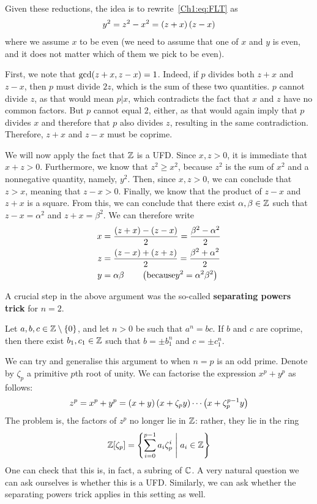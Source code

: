 Given these reductions, the idea is to rewrite~\eqref{Ch1:eq:FLT} as
\begin{align*}
    y^2 = z^2 - x^2 = \left( z + x \right)\left( z - x \right)
\end{align*}
where we assume $x$ to be even (we need to assume that one of $x$ and $y$ is even, and it does not matter which of them we pick to be even).

First, we note that $\gcd\!\left( z + x, z - x \right) = 1$. Indeed, if $p$ divides both $z + x$ and $z - x$, then $p$ must divide $2z$, which is the sum of these two quantities. $p$ cannot divide $z$, as that would mean $p \vert x$, which contradicts the fact that $x$ and $z$ have no common factors. But $p$ cannot equal $2$, either, as that would again imply that $p$ divides $x$ and therefore that $p$ also divides $z$, resulting in the same contradiction. Therefore, $z + x$ and $z - x$ must be coprime.

We will now apply the fact that $\mathbb{Z}$ is a UFD. Since $x, z > 0$, it is immediate that $x + z > 0$. Furthermore, we know that $z^2 \geq x^2$, because $z^2$ is the sum of $x^2$ and a nonnegative quantity, namely, $y^2$. Then, since $x, z > 0$, we can conclude that $z > x$, meaning that $z - x > 0$. Finally, we know that the product of $z - x$ and $z + x$ is a square. From this, we can conclude that there exist $\alpha, \beta \in \mathbb{Z}$ such that $z - x = \alpha^2$ and $z + x = \beta^2$. We can therefore write
\begin{align*}
    x &= \frac{\left( z + x \right) - \left( z - x \right)}{2} = \frac{\beta^2 - \alpha^2}{2} \\
    z &= \frac{\left( z - x \right) + \left( z + z \right)}{2} = \frac{\beta^2 + \alpha^2}{2} \\
    y &= \alpha \beta \qquad \left( \text{because} y^2 = \alpha^2 \beta^2 \right)
\end{align*}

A crucial step in the above argument was the so-called \textbf{separating powers trick} for $n = 2$.

\begin{boxlemma}
    Let $a, b, c \in \mathbb{Z} \setminus \left\{ 0 \right\}$, and let $n > 0$ be such that $a^n = b c$. If $b$ and $c$ are coprime, then there exist $b_1, c_1 \in \mathbb{Z}$ such that $b = \pm b_1 ^ n$ and $c = \pm c_1 ^ n$.
\end{boxlemma}

We can try and generalise this argument to when $n = p$ is an odd prime. Denote by $\zeta_p$ a primitive $p$th root of unity. We can factorise the expression $x^p + y^p$ as follows:
\begin{align*}
    z^p = x^p + y^p = \left( x + y \right)\left( x + \zeta_p y \right) \cdots \left( x + \zeta_p^{p - 1}y \right)
\end{align*}
The problem is, the factors of $z^p$ no longer lie in $\mathbb{Z}$: rather, they lie in the ring
\begin{align*}
    \mathbb{Z}\!\left[ \zeta_p \right] = \left\{ \sum_{i=0}^{p-1}a_i \zeta_p^i \; \middle\vert \; a_i \in \mathbb{Z} \right\}
\end{align*}
One can check that this is, in fact, a subring of $\mathbb{C}$. A very natural question we can ask ourselves is whether this is a UFD. Similarly, we can ask whether the separating powers trick applies in this setting as well.

